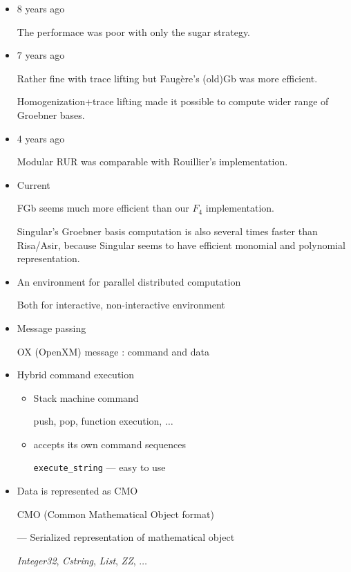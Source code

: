 \begin{slide}{}

\begin{itemize}
\item 8 years ago

The performace was poor with only the sugar strategy.

\item 7 years ago

Rather fine with trace lifting but Faug\`ere's (old)Gb was more
efficient.  

Homogenization+trace lifting made it possible to compute
wider range of Groebner bases.

\item 4 years ago

Modular RUR was comparable with Rouillier's implementation.

\item Current

FGb seems much more efficient than our $F_4$ implementation.

Singular's Groebner basis computation is also several times
faster than Risa/Asir, because Singular seems to have efficient
monomial and polynomial representation.

\end{itemize}
\end{slide}

\begin{slide}{}

\begin{itemize}
\item An environment for parallel distributed computation

Both for interactive, non-interactive environment

\item Message passing

OX (OpenXM) message : command and data

\item Hybrid command execution

\begin{itemize}
\item Stack machine command

push, pop, function execution, $\ldots$

\item accepts its own command sequences

{\tt execute\_string} --- easy to use
\end{itemize}

\item Data is represented as CMO

CMO (Common Mathematical Object format)

--- Serialized representation of mathematical object

{\sl Integer32}, {\sl Cstring}, {\sl List}, {\sl ZZ}, $\ldots$
\end{itemize}
\end{slide}


